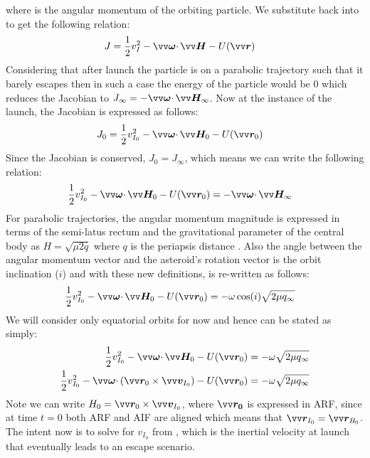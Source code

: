 where  is the angular momentum of the orbiting particle. We substitute  back into  to get the following relation:
\begin{align}
    J &= \frac{1}{2} v_I^2 - \bv{\omega} \cdotp \bv{H} - U(\bv{r})
    \label{eqn:jacobian_mod}
\end{align}
Considering that after launch the particle is on a parabolic trajectory such that it barely escapes then in such a case the energy of the particle would be 0 which reduces the Jacobian to $J_{\infty} = -\bv{\omega} \cdotp \bv{H}_{\infty}$. Now at the instance of the launch, the Jacobian is expressed as follows:
\begin{align}
    J_0 &= \frac{1}{2} v_{I_0}^2 - \bv{\omega} \cdotp \bv{H}_0 - U(\bv{r}_0)
    \label{eqn:jacobian_t0}
\end{align}
Since the Jacobian is conserved, $J_0 = J_{\infty}$, which means we can write the following relation:
\begin{align}
    \frac{1}{2} v_{I_0}^2 - \bv{\omega} \cdotp \bv{H}_0 - U(\bv{r}_0) &= -\bv{\omega} \cdotp \bv{H}_{\infty}
    \label{eqn:jacobian_equate}
\end{align}
For parabolic trajectories, the angular momentum magnitude is expressed in terms of the semi-latus rectum and the gravitational parameter of the central body as $H = \sqrt{\mu 2q}$ where $q$ is the periapsis distance \parencite{schaub2003Book}. Also the angle between the angular momentum vector and the asteroid's rotation vector is the orbit inclination ($i$) and with these new definitions,  is re-written as follows:
\begin{align}
    \frac{1}{2} v_{I_0}^2 - \bv{\omega} \cdotp \bv{H}_0 - U(\bv{r}_0) &= -\omega \cos(i) \sqrt{2\mu q_{\infty}}
    \label{eqn:jacobian_equate_cosi}
\end{align}
We will consider only equatorial orbits for now and hence  can be stated as simply:
\begin{align}
    \frac{1}{2} v_{I_0}^2 - \bv{\omega} \cdotp \bv{H}_0 - U(\bv{r}_0) &= -\omega \sqrt{2\mu q_{\infty}} \\
    \frac{1}{2} v_{I_0}^2 - \bv{\omega} \cdotp (\bv{r}_0 \times \bv{v}_{I_0}) - U(\bv{r}_0) &= -\omega \sqrt{2\mu q_{\infty}}
    \label{eqn:jacobian_equate_equatorial}
\end{align}
Note we can write $H_0 = \bv{r}_0 \times \bv{v}_{I_0}$, where $\bv{r_0}$ is expressed in \gls{ARF}, since at time $t = 0$ both \gls{ARF} and \gls{AIF} are aligned which means that $\bv{r}_{I_0} = \bv{r}_{B_0}$. The intent now is to solve for $v_{I_0}$ from , which is the inertial velocity at launch that eventually leads to an escape scenario.
